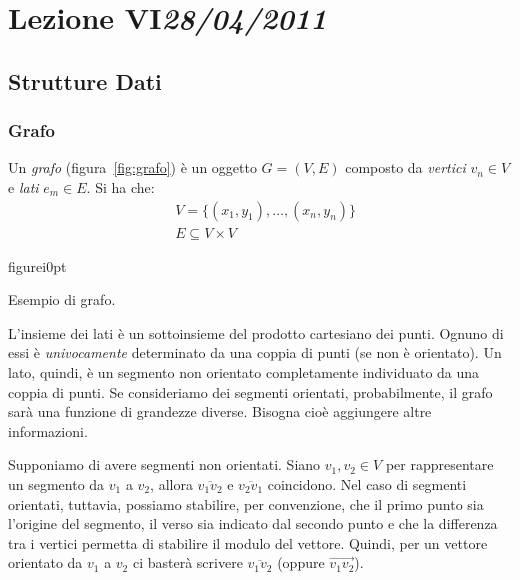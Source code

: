 \chapter[Lezione VI]{Lezione VI\newline\small{\emph{28/04/2011}}}
	\section{Strutture Dati}
		\subsection{Grafo}
		\label{subsec:grafo}
Un \emph{grafo} (figura~\vref{fig:grafo}) è un oggetto $G = (V, E)$ composto da \emph{vertici} $v_n\in V$ e \emph{lati} $e_m\in E$. Si ha che:
\[
\begin{split}
&V=\{(x_1,y_1),\dots,(x_n,y_n)\} \\
&E\subseteq V\times V
\end{split}
\]
\begin{wrapfloat}{figure}{i}{0pt}{
}
	\caption{Esempio di grafo.}
	\label{fig:grafo}
\end{wrapfloat}
L'insieme dei lati è un sottoinsieme del prodotto cartesiano dei punti. Ognuno di essi è \emph{univocamente} determinato da una coppia di punti (se non è orientato). Un lato, quindi, è un segmento non orientato completamente individuato da una coppia di punti. Se consideriamo dei segmenti orientati, probabilmente, il grafo sarà una funzione di grandezze diverse. Bisogna cioè aggiungere altre informazioni.

Supponiamo di avere segmenti non orientati. Siano $v_1,v_2\in V$ per rappresentare un segmento da $v_1$ a $v_2$, allora $\overline{v_{1}v_{2}}$ e $\overline{v_{2}v_{1}}$ coincidono. Nel caso di segmenti orientati, tuttavia, possiamo stabilire, per convenzione, che il primo punto sia l'origine del segmento, il verso sia indicato dal secondo punto e che la differenza tra i vertici permetta di stabilire il modulo del vettore. Quindi, per un vettore orientato da $v_1$ a $v_2$ ci basterà scrivere $\overline{v_{1}v_{2}}$ (oppure $\overrightarrow{v_{1}v_{2}}$).

